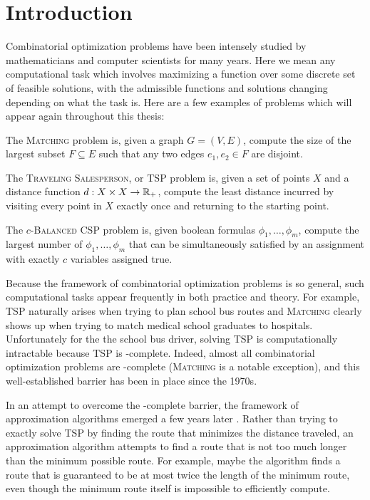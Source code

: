 \chapter{Introduction}\label{cha:introduction}
Combinatorial optimization problems have been intensely studied by mathematicians and computer scientists for many years.
Here we mean any computational task which involves maximizing a function over some discrete set of feasible solutions, with the admissible functions and solutions changing depending on what the task is. 
Here are a few examples of problems which will appear again throughout this thesis:
\begin{example}
The \textsc{Matching} problem is, given a graph $G = (V,E)$, compute the size of the largest subset $F \subseteq E$ such that any two edges $e_1,e_2 \in F$ are disjoint.
\end{example}
\begin{example}
The \textsc{Traveling Salesperson}, or \textsc{TSP} problem is, given a set of points $X$ and a distance function $d: X \times X \rightarrow \mathbb R_+$, compute the least distance incurred by visiting every point in $X$ exactly once and returning to the starting point. 
\end{example}
\begin{example}
The \textsc{$c$-Balanced CSP} problem is, given boolean formulas $\phi_1,\dots,\phi_m$, compute the largest number of $\phi_1,\dots,\phi_m$ that can be simultaneously satisfied by an assignment with exactly $c$ variables assigned true. 
\end{example}

Because the framework of combinatorial optimization problems is so general, such computational tasks appear frequently in both practice and theory.
For example, \textsc{TSP} naturally arises when trying to plan school bus routes and \textsc{Matching} clearly shows up when trying to match medical school graduates to hospitals. Unfortunately for the the school bus driver, solving \textsc{TSP} is computationally intractable because \textsc{TSP} is \np-complete\cite{Karp1972}. Indeed, almost all combinatorial optimization problems are \np-complete (\textsc{Matching} is a notable exception), and this well-established barrier has been in place since the 1970s. 

In an attempt to overcome the \np-complete barrier, the framework of approximation algorithms emerged a few years later \cite{SG76}. Rather than trying to exactly solve \textsc{TSP} by finding the route that minimizes the distance traveled, an approximation algorithm attempts to find a route that is not too much longer than the minimum possible route. For example, maybe the algorithm finds a route that is guaranteed to be at most twice the length of the minimum route, even though the minimum route itself is impossible to efficiently compute. 

